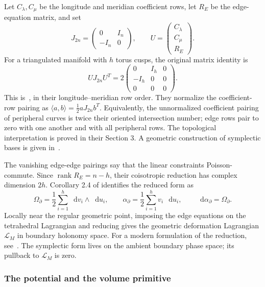 \documentclass[11pt,a4paper]{article}
\numberwithin{equation}{section}
\theoremstyle{definition}
\theoremstyle{remark}
\newcommand{\dd}{\mathop{}\!\mathrm d}
\begin{document}
Let $C_\lambda,C_\mu$ be the longitude and meridian coefficient rows,
let $R_E$ be the edge-equation matrix, and set
\[
 J_{2n}=\begin{pmatrix}0&I_n\\-I_n&0\end{pmatrix},\qquad
 U=\begin{pmatrix}C_\lambda\\C_\mu\\R_E\end{pmatrix}.
\]
For a triangulated manifold with $h$ torus cusps, the original matrix identity is
\begin{equation}
 \boxed{U J_{2n}U^T
 =2\begin{pmatrix}0&I_h&0\\-I_h&0&0\\0&0&0\end{pmatrix}.}
 \label{eq:NZmatrixpairing}
\end{equation}
This is~\cite[Theorem 2.2, equation (21)]{NeumannZagier}, in their
longitude--meridian row order. They normalize the coefficient-row
pairing as $\langle a,b\rangle=\tfrac12aJ_{2n}b^T$.
Equivalently, the unnormalized coefficient pairing of peripheral curves
is twice their oriented intersection number; edge rows pair to zero
with one another and with all peripheral rows. The topological
interpretation is proved in their Section 3. A geometric construction
of symplectic bases is given in~\cite{MathewsPurcellSymplectic}.

The vanishing edge-edge pairings say that the linear constraints
Poisson-commute. Since $\operatorname{rank}R_E=n-h$, their
coisotropic reduction has complex dimension $2h$. Corollary 2.4 of
\cite{NeumannZagier} identifies the reduced form as
\begin{equation}
 \boxed{\Omega_\partial=\frac12\sum_{i=1}^h
                   \dd v_i\wedge\dd u_i,\qquad
 \alpha_\partial=\frac12\sum_{i=1}^h v_i\,\dd u_i,
 \qquad \dd\alpha_\partial=\Omega_\partial.}
 \label{eq:NZboundarysymplectic}
\end{equation}
Locally near the regular geometric point, imposing the edge equations
on the tetrahedral Lagrangian and reducing gives the geometric
deformation Lagrangian $\mathcal L_M$ in boundary holonomy space.
For a modern formulation of the reduction, see~\cite{DimofteVeen}.
The symplectic form lives on the ambient boundary phase space;
its pullback to $\mathcal L_M$ is zero.

\subsubsection{The potential and the volume primitive}
\end{document}
